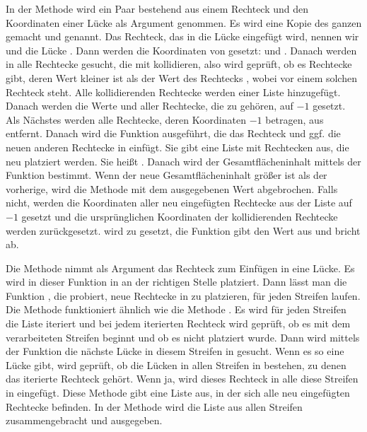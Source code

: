In der Methode  wird ein Paar bestehend
aus einem Rechteck und den Koordinaten einer Lücke als Argument genommen.
Es wird eine Kopie des ganzen   gemacht
und  genannt. 
Das Rechteck, das in die Lücke eingefügt wird, nennen wir  und
die Lücke .
Dann werden die Koordinaten von  gesetzt:  und
.
Danach werden in  alle Rechtecke gesucht, die mit
 kollidieren, also wird geprüft, ob es Rechtecke gibt, deren
Wert  kleiner ist als der Wert  des Rechtecks , 
wobei  vor einem solchen Rechteck steht.
Alle kollidierenden Rechtecke werden einer Liste 
hinzugefügt. 
Danach werden die Werte  und  aller Rechtecke, die zu 
gehören, auf $-1$ gesetzt.
Als Nächstes werden alle Rechtecke, deren Koordinaten $-1$ betragen, aus 
entfernt.
Danach wird die Funktion  ausgeführt, die das Rechteck  und ggf.
die neuen anderen Rechtecke in  einfügt.
Sie gibt eine Liste mit Rechtecken aus, die neu platziert werden. Sie heißt .
Danach wird der Gesamtflächeninhalt mittels der Funktion 
bestimmt.
Wenn der neue Gesamtflächeninhalt größer ist als der vorherige,
wird die Methode  mit dem ausgegebenen Wert  abgebrochen.
Falls nicht, werden die Koordinaten
aller neu eingefügten Rechtecke aus der Liste 
auf $-1$ gesetzt und die 
ursprünglichen Koordinaten der kollidierenden Rechtecke werden zurückgesetzt. 
 wird zu  gesetzt, die Funktion gibt den Wert  
aus und bricht ab.

Die Methode  nimmt als Argument das Rechteck zum Einfügen in eine Lücke.
Es wird in dieser Funktion in  an der richtigen Stelle platziert.
Dann lässt man die Funktion ,
die probiert, neue Rechtecke in  zu platzieren, für jeden Streifen laufen. 
Die Methode  funktioniert ähnlich wie die Methode .
Es wird für jeden Streifen die Liste  iteriert und bei jedem
iterierten Rechteck  wird geprüft, ob es mit dem verarbeiteten Streifen beginnt und
ob es nicht platziert wurde.
Dann wird mittels der Funktion  die nächste Lücke in diesem Streifen
in  gesucht.
Wenn es so eine Lücke gibt, wird geprüft, ob die Lücken in allen Streifen in 
bestehen, zu denen das iterierte Rechteck gehört.
Wenn ja, wird dieses Rechteck in alle diese Streifen in  eingefügt.
Diese Methode gibt eine Liste  aus, in der sich alle neu eingefügten Rechtecke 
befinden.
In der Methode  wird die Liste  aus
allen Streifen zusammengebracht und ausgegeben.


